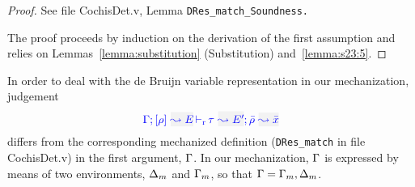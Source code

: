 {\centering
{}}
\begin{proof}
See file CochisDet.v, Lemma \tt{DRes\_match\_Soundness}.

The proof proceeds by induction on the derivation of the first assumption and relies on Lemmas~\ref{lemma:substitution} (Substitution) and~\ref{lemma:s23:5}.
\end{proof}
In order to deal with the de Bruijn variable representation in our mechanization,
judgement
\begin{equation*}
  \dmres{\tenv}{\rulet}{E}{\type}{E'}{\ie{\ruleset}{\bar{x}}}
\end{equation*}
differs from the corresponding mechanized definition (\texttt{DRes\_match} in file CochisDet.v) in the first argument, $\Gamma$. In our mechanization, $\Gamma$ is expressed by means of two environments, $\Delta_m$ and $\Gamma_m$, so that $\Gamma = \Gamma_m,\Delta_m$.

{\centering
{}}

